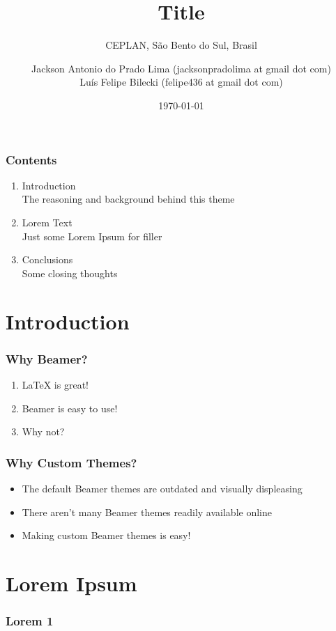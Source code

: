 \documentclass[aspectratio=169]{beamer}
\title{Title}
\author{Jackson Antonio do Prado Lima (jacksonpradolima at gmail dot com) \\  Luís Felipe Bilecki (felipe436 at gmail dot com)}
\date{\today}
\subtitle{\tiny{CEPLAN, São Bento do Sul, Brasil}}
\begin{document}
	\frame{\titlepage}

	\begin{frame}		
		\frametitle{Contents}
		\begin{enumerate}
			\item Introduction \\ \textcolor{ExecusharesGrey}{\footnotesize\hspace{1em} The reasoning and background behind this theme}
			\item Lorem Text  \\ \textcolor{ExecusharesGrey}{\footnotesize\hspace{1em} Just some Lorem Ipsum for filler}
			\item Conclusions \\ \textcolor{ExecusharesGrey}{\footnotesize\hspace{1em} Some closing thoughts}
		\end{enumerate}
	\end{frame}

	\startprogressbar
	
	\section{Introduction}
		\begin{frame}
			\frametitle{Why Beamer?}
			\begin{enumerate}
				\item LaTeX is great!
				\item Beamer is easy to use!
				\item Why not?
			\end{enumerate}
		\end{frame}

		\begin{frame}
			\frametitle{Why Custom Themes?}
			\begin{itemize}
				\item The default Beamer themes are outdated and visually displeasing
				\item There aren't many Beamer themes readily available online
				\item Making custom Beamer themes is easy!
			\end{itemize}
		\end{frame}

	\section{Lorem Ipsum}
		\begin{frame}
			\frametitle{Lorem 1}
			\blindtext
		\end{frame}
\end{document}
